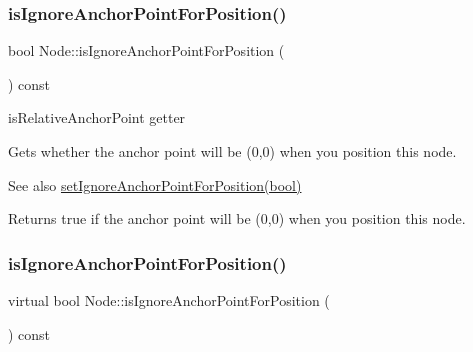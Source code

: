 \mbox{\label{classNode_a1997a39d72ed74207a8ff7b5fe921be9}} 
\subsubsection{\texorpdfstring{is\+Ignore\+Anchor\+Point\+For\+Position()}{isIgnoreAnchorPointForPosition()}\hspace{0.1cm}{\footnotesize\ttfamily [1/2]}}
{\footnotesize\ttfamily bool Node\+::is\+Ignore\+Anchor\+Point\+For\+Position (\begin{DoxyParamCaption}{ }\end{DoxyParamCaption}) const\hspace{0.3cm}{\ttfamily [virtual]}}



is\+Relative\+Anchor\+Point getter 

Gets whether the anchor point will be (0,0) when you position this node.

\begin{DoxySeeAlso}{See also}
{\ttfamily \hyperlink{classNode_a75e8f6a6a46358d6faf8683e720d47b5}{set\+Ignore\+Anchor\+Point\+For\+Position(bool)}}
\end{DoxySeeAlso}
\begin{DoxyReturn}{Returns}
true if the anchor point will be (0,0) when you position this node. 
\end{DoxyReturn}
\mbox{\label{classNode_a083fb03ef1904b0b0d4bc12c40a23f5c}} 
\subsubsection{\texorpdfstring{is\+Ignore\+Anchor\+Point\+For\+Position()}{isIgnoreAnchorPointForPosition()}\hspace{0.1cm}{\footnotesize\ttfamily [2/2]}}
{\footnotesize\ttfamily virtual bool Node\+::is\+Ignore\+Anchor\+Point\+For\+Position (\begin{DoxyParamCaption}{ }\end{DoxyParamCaption}) const\hspace{0.3cm}{\ttfamily [virtual]}}

